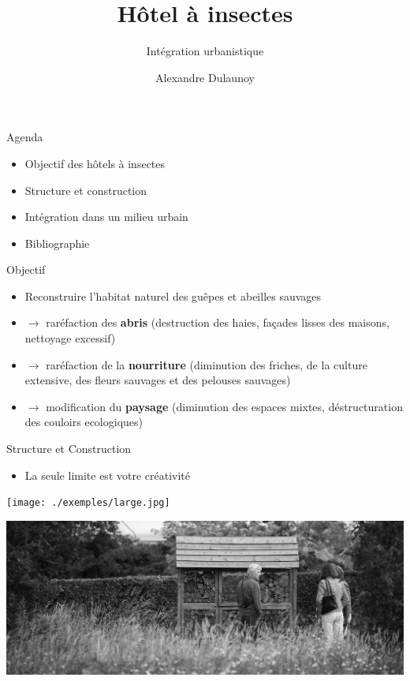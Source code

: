 \documentclass{beamer}
\begin{document}
\title{Hôtel à insectes}
\subtitle{Intégration urbanistique}
\author{Alexandre Dulaunoy}
\maketitle
\begin{frame}{Agenda}
    \begin{itemize}
        \item{Objectif des hôtels à insectes}
        \item{Structure et construction}
        \item{Intégration dans un milieu urbain}
        \item{Bibliographie}
    \end{itemize}
\end{frame}
\begin{frame}{Objectif}
    \begin{itemize}
        \item Reconstruire l'habitat naturel des guêpes et abeilles sauvages
        \item $\rightarrow$ raréfaction des {\bf abris} (destruction des haies, façades lisses des maisons, nettoyage excessif)
        \item $\rightarrow$ raréfaction de la {\bf nourriture} (diminution des friches, de la culture extensive, des fleurs sauvages et des pelouses sauvages)
        \item $\rightarrow$ modification du {\bf paysage} (diminution des espaces mixtes, déstructuration des couloirs ecologiques)
    \end{itemize}
\end{frame}

\begin{frame}{Structure et Construction}
        \begin{itemize}
                \item La seule limite est votre créativité
        \end{itemize}
\end{frame}
\begin{frame}
        \texttt{[image: ./exemples/large.jpg]}
\end{frame}
\begin{frame}
        \includegraphics[scale=0.05]{./exemples/integration.jpg}
\end{frame}
\end{document}
